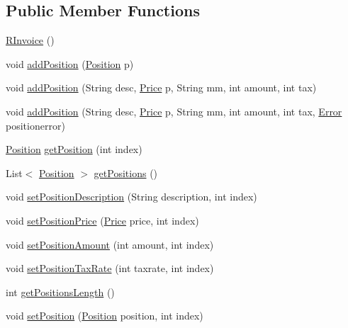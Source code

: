 \subsection*{Public Member Functions}
\begin{DoxyCompactItemize}
\item 
\hyperlink{class_reduced_invoice_1_1_r_invoice_a382c34ce7698a3e5cc9301c8cc3a5828}{R\+Invoice} ()
\item 
void \hyperlink{class_reduced_invoice_1_1_r_invoice_ae51bf96a9fc6c76ba5d79a813f4a1da0}{add\+Position} (\hyperlink{class_reduced_invoice_1_1_position}{Position} p)
\item 
void \hyperlink{class_reduced_invoice_1_1_r_invoice_aac8d8e74616bac5d81e446d47b31d5e7}{add\+Position} (String desc, \hyperlink{class_reduced_invoice_1_1_price}{Price} p, String mm, int amount, int tax)
\item 
void \hyperlink{class_reduced_invoice_1_1_r_invoice_ac851aecb0cdd4da309d203f0dfc4b55f}{add\+Position} (String desc, \hyperlink{class_reduced_invoice_1_1_price}{Price} p, String mm, int amount, int tax, \hyperlink{enum_reduced_invoice_1_1_a_invoice_1_1_error}{Error} positionerror)
\item 
\hyperlink{class_reduced_invoice_1_1_position}{Position} \hyperlink{class_reduced_invoice_1_1_r_invoice_a552d88c5808181f8fe3ca72772b5aff6}{get\+Position} (int index)
\item 
List$<$ \hyperlink{class_reduced_invoice_1_1_position}{Position} $>$ \hyperlink{class_reduced_invoice_1_1_r_invoice_a55b11262453617b33490afbc040761f6}{get\+Positions} ()
\item 
void \hyperlink{class_reduced_invoice_1_1_r_invoice_ab9c5e05457fa8a64a6ffcd8d6261e2a0}{set\+Position\+Description} (String description, int index)
\item 
void \hyperlink{class_reduced_invoice_1_1_r_invoice_a9c47d95997895b056a0e84741313dc0a}{set\+Position\+Price} (\hyperlink{class_reduced_invoice_1_1_price}{Price} price, int index)
\item 
void \hyperlink{class_reduced_invoice_1_1_r_invoice_ac463aa248993dd296ba9ea81356726b4}{set\+Position\+Amount} (int amount, int index)
\item 
void \hyperlink{class_reduced_invoice_1_1_r_invoice_a7b553ca5131f6059b022f9815be42c17}{set\+Position\+Tax\+Rate} (int taxrate, int index)
\item 
int \hyperlink{class_reduced_invoice_1_1_r_invoice_a3df22a621cc8ed79efa13bcb6284cadc}{get\+Positions\+Length} ()
\item 
void \hyperlink{class_reduced_invoice_1_1_r_invoice_a263bac524d7b762b58c124def1a20325}{set\+Position} (\hyperlink{class_reduced_invoice_1_1_position}{Position} position, int index)
\end{DoxyCompactItemize}

